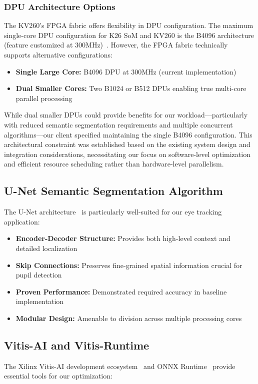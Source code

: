 \subsubsection{DPU Architecture Options}
The KV260's FPGA fabric offers flexibility in DPU configuration. The maximum single-core DPU configuration for K26 SoM and KV260 is the B4096 architecture (feature customized at 300MHz)~\cite{amd_ug1354_kv260,amd_kv260_b4096_forum}. However, the FPGA fabric technically supports alternative configurations:

\begin{itemize}
\item \textbf{Single Large Core:} B4096 DPU at 300MHz (current implementation)
\item \textbf{Dual Smaller Cores:} Two B1024 or B512 DPUs enabling true multi-core parallel processing
\end{itemize}

While dual smaller DPUs could provide benefits for our workload—particularly with reduced semantic segmentation requirements and multiple concurrent algorithms—our client specified maintaining the single B4096 configuration. This architectural constraint was established based on the existing system design and integration considerations, necessitating our focus on software-level optimization and efficient resource scheduling rather than hardware-level parallelism.

\subsection{U-Net Semantic Segmentation Algorithm}
The U-Net architecture~\cite{ronneberger2015} is particularly well-suited for our eye tracking application:

\begin{itemize}
\item \textbf{Encoder-Decoder Structure:} Provides both high-level context and detailed localization
\item \textbf{Skip Connections:} Preserves fine-grained spatial information crucial for pupil detection
\item \textbf{Proven Performance:} Demonstrated required accuracy in baseline implementation
\item \textbf{Modular Design:} Amenable to division across multiple processing cores
\end{itemize}

\subsection{Vitis-AI and Vitis-Runtime}
The Xilinx Vitis-AI development ecosystem~\cite{amd2023vitis} and ONNX Runtime~\cite{onnxruntime} provide essential tools for our optimization:

